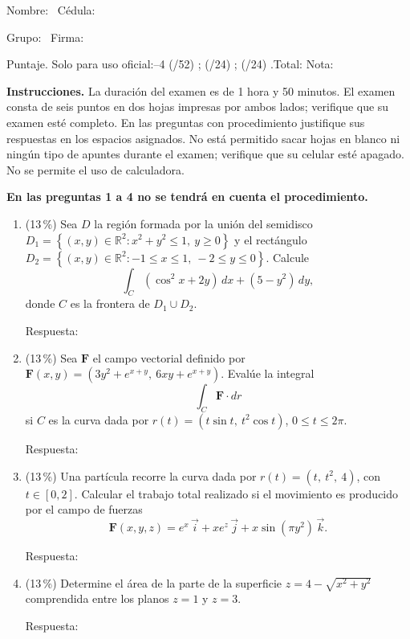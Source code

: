 \documentclass[11pt]{article}
\begin{document}
\examheader

\vspace{4pt}
\noindent Nombre: \dotfill\ Cédula: \dotfill

\vspace{4pt}
\noindent Grupo: \dotfill\ Firma: \dotfill

\vspace{4pt}
\noindent Puntaje. Solo para uso oficial:--4 (/52) \dotfill; (/24) \dotfill; (/24) \dotfill.\quad Total: \dotfill\quad Nota: \dotfill

\vspace{6pt}
\noindent\textbf{Instrucciones.} La duración del examen es de 1 hora y 50 minutos. El examen consta de seis puntos en dos hojas impresas por ambos lados; verifique que su examen esté completo. En las preguntas con procedimiento justifique sus respuestas en los espacios asignados. No está permitido sacar hojas en blanco ni ningún tipo de apuntes durante el examen; verifique que su celular esté apagado. No se permite el uso de calculadora.

\vspace{8pt}
\noindent\textbf{En las preguntas 1 a 4 no se tendrá en cuenta el procedimiento.}

\begin{enumerate}
\item{} (13\,\%) Sea $D$ la región formada por la unión del semidisco $D_1 = \left\{(x,y)\in\mathbb{R}^2 : x^2 + y^2 \leq 1,\ y \geq 0\right\}$ y el rectángulo $D_2 = \left\{(x,y)\in\mathbb{R}^2 : -1 \leq x \leq 1,\ -2 \leq y \leq 0\right\}$. Calcule
\[
\int_C (\cos^2 x + 2y)\,dx + (5 - y^2)\,dy,
\]
donde $C$ es la frontera de $D_1 \cup D_2$.

\vspace{2pt}
\noindent Respuesta: \underline{\phantom{XXXXXXXXXXXX}}

\item{} (13\,\%) Sea $\mathbf F$ el campo vectorial definido por $\mathbf F(x,y) = \left(3y^2 + e^{x+y},\ 6xy + e^{x+y}\right)$. Evalúe la integral
\[
\int_C \mathbf F \cdot dr
\]
si $C$ es la curva dada por $r(t) = (t\sin t,\ t^2\cos t)$, $0 \leq t \leq 2\pi$.

\vspace{2pt}
\noindent Respuesta: \underline{\phantom{XXXXXXXXXXXX}}

\item{} (13\,\%) Una partícula recorre la curva dada por $r(t) = (t,\ t^2,\ 4)$, con $t \in [0,2]$. Calcular el trabajo total realizado si el movimiento es producido por el campo de fuerzas
\[
\mathbf F(x,y,z) = e^x\,\vec i + xe^z\,\vec j + x\sin(\pi y^2)\,\vec k.
\]

\vspace{2pt}
\noindent Respuesta: \underline{\phantom{XXXXXXXXXXXX}}

\item{} (13\,\%) Determine el área de la parte de la superficie $z = 4 - \sqrt{x^2+y^2}$ comprendida entre los planos $z = 1$ y $z = 3$.

\vspace{2pt}
\noindent Respuesta: \underline{\phantom{XXXXXXXXXXXX}}
\end{enumerate}
\end{document}
